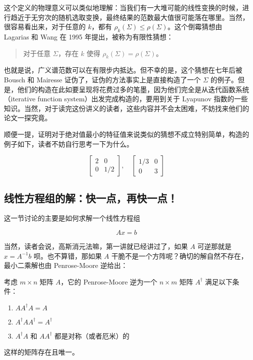 这个定义的物理意义可以类似地理解：当我们有一大堆可能的线性变换的时候，进行趋近于无穷次的随机选取变换，最终结果的范数最大值很可能落在哪里。当然，很容易看出来，对于任意的 $k$，都有 $\rho_k(\Sigma) \leqslant \rho(\Sigma)$。这个倒霉猜想由 Lagarias 和 Wang 在 1995 年提出，被称为有限性猜想：

\begin{quote}
    \kaishu
    对于任意 $\Sigma$，存在 $k$ 使得 $\rho_k(\Sigma) = \rho(\Sigma)$。
\end{quote}

也就是说，广义谱范数可以在有限步内抵达。但不幸的是，这个猜想在七年后被 Bousch 和 Mairesse 证伪了，证伪的方法事实上是直接构造了一个 $\Sigma$ 的例子。但是，他们的构造在此如要呈现将花费过多的笔墨，因为他们完全是从迭代函数系统（iterative function system）出发完成构造的，要用到关于 Lyapunov 指数的一些知识。当然，对于读完这份讲义的读者，这些内容并不会太困难，不妨找来他们的论文一探究竟。

顺便一提，证明对于绝对值最小的特征值来说类似的猜想不成立特别简单，构造的例子如下，读者不妨自行思考一下为什么。

\[
\begin{bmatrix}
2 & 0 \\ 0 & 1/2
\end{bmatrix}, \quad \begin{bmatrix}
1/3 & 0 \\ 0 & 3
\end{bmatrix}
\]

\subsection{线性方程组的解：快一点，再快一点！}

这一节讨论的主要是如何求解一个线性方程组

\[
Ax = b
\]

当然，读者会说，高斯消元法嘛，第一讲就已经讲过了，如果 $A$ 可逆那就是 $x = A^{-1}b$ 呗。也不算错，那如果 $A$ 干脆不是一个方阵呢？确切的解自然不存在，最小二乘解也由 Penrose-Moore 逆给出：

\begin{definition}
    考虑 $m \times n$ 矩阵 $A$，它的 Penrose-Moore 逆为一个 $n \times m$ 矩阵 $A^\dagger$ 满足以下条件：

    \begin{enumerate}
        \item $A A^\dagger A = A$
        \item $A^\dagger A A^\dagger = A^\dagger$
        \item $A^\dagger A$ 和 $AA^\dagger$ 都是对称（或者厄米）的
    \end{enumerate}

    这样的矩阵存在且唯一。
\end{definition}

